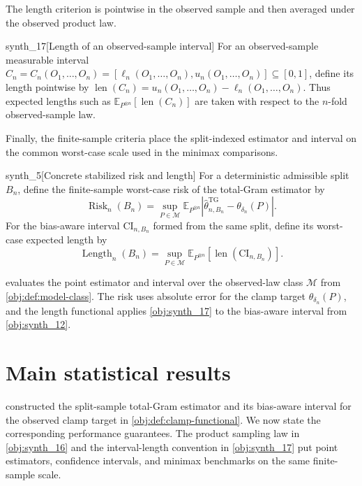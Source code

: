 \documentclass[11pt]{article}
\begin{document}
The length criterion is pointwise in the observed sample and then averaged under the observed product law.

\begin{definitionv}{synth_17}[Length of an observed-sample interval]
For an observed-sample measurable interval \(C_n=C_n(O_1,\ldots,O_n)=[\ell_n(O_1,\ldots,O_n),u_n(O_1,\ldots,O_n)]\subseteq[0,1]\), define its length pointwise by \(\operatorname{len}(C_n)=u_n(O_1,\ldots,O_n)-\ell_n(O_1,\ldots,O_n)\). Thus expected lengths such as \(\mathbb E_{P^{\otimes n}}[\operatorname{len}(C_n)]\) are taken with respect to the \(n\)-fold observed-sample law.
\end{definitionv}

Finally, the finite-sample criteria place the split-indexed estimator and interval on the common worst-case scale used in the minimax comparisons.

\begin{definitionv}{synth_5}[Concrete stabilized risk and length]
For a deterministic admissible split \(B_n\), define the finite-sample worst-case risk of the total-Gram estimator by
\[
  \operatorname{Risk}_n(B_n)=\sup_{P\in\mathcal M}
  \mathbb E_{P^{\otimes n}}\!\left|\widehat\theta_{n,B_n}^{\mathrm{TG}}-\theta_{\delta_n}(P)\right|.
\]
For the bias-aware interval \(\mathrm{CI}_{n,B_n}\) formed from the same split, define its worst-case expected length by
\[
  \operatorname{Length}_n(B_n)=\sup_{P\in\mathcal M}
  \mathbb E_{P^{\otimes n}}[\operatorname{len}(\mathrm{CI}_{n,B_n})].
\]
\end{definitionv}

 evaluates the point estimator and interval over the observed-law class \(\mathcal M\) from \cref{obj:def:model-class}. The risk uses absolute error for the clamp target \(\theta_{\delta_n}(P)\), and the length functional applies \cref{obj:synth_17} to the bias-aware interval from \cref{obj:synth_12}.


\section{Main statistical results}
\label{sec:main-statistical-results}

 constructed the split-sample total-Gram estimator and its bias-aware interval for the observed clamp target in \cref{obj:def:clamp-functional}. We now state the corresponding performance guarantees. The product sampling law in \cref{obj:synth_16} and the interval-length convention in \cref{obj:synth_17} put point estimators, confidence intervals, and minimax benchmarks on the same finite-sample scale.
\end{document}
